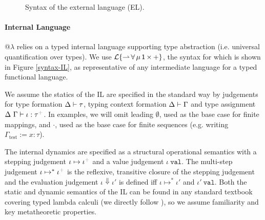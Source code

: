 \documentclass[10pt,preprint]{sigplanconf}
\newcommand{\moutput}{^{\color{gray}+}}
\begin{document}
\begin{figure}[t]
\small
\hspace{-5px}
\caption{Syntax of the external language (EL).}\label{syntax-EL}
\end{figure}



\paragraph{Internal Language} 
@$\lambda$ relies on a typed internal language supporting type abstraction (i.e. universal quantification over types). We use {$\mathcal{L}\{{\rightharpoonup}\,{\forall}\,{\mu}\,{{\sf 1}}\,{\times}\,{+}\}$}, the syntax for which is shown in Figure \ref{syntax-IL}, as representative of any intermediate language for a typed functional language. %

We assume the statics of the IL are specified in the standard way by judgements for  type formation {$\Delta \vdash \tau$}, typing context formation { $\Delta \vdash \Gamma$} and type assignment {$\iDelta~\iGamma \vdash \iota : \tau\moutput$}. 
In examples, we will omit leading $\emptyset$, used as the base case for finite mappings, and $\cdot$, used as the base case for finite sequences (e.g. writing $\Gamma_\text{test} := x : \tau$). 

The internal dynamics are specified as a structural operational semantics with a stepping judgement {\small $\iota \mapsto \iota\moutput$} and a value judgement {$\iota~\mathtt{val}$}. The multi-step judgement $\iota \mapsto^{*} \iota\moutput$ is the reflexive, transitive closure of the stepping judgement and the evaluation judgement $\iota \Downarrow \iota'$ is defined iff $\iota \mapsto^{*} \iota'$ and $\iota'~\mathtt{val}$. Both the static and dynamic semantics of the IL can be found in any standard textbook covering typed lambda calculi (we directly follow \cite{pfpl}), so we assume familiarity and key metatheoretic properties.

\end{document}
